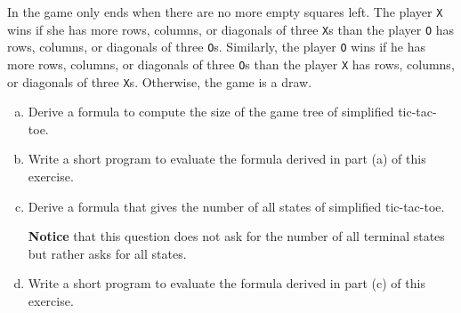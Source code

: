 \exercise
In  the game only ends when there are no more empty squares left.
The player \texttt{X} wins if she has more rows, columns, or diagonals of three \texttt{X}s than the player
\texttt{O} has rows, columns, or diagonals of three \texttt{O}s.  Similarly, the player \texttt{O} wins
if he has more rows, columns, or diagonals of three \texttt{O}s than the player \texttt{X} has rows, columns,
or diagonals of three \texttt{X}s.  Otherwise, the game is a draw. 
\begin{enumerate}[(a)]
\item Derive a formula to compute the size of the game tree of simplified tic-tac-toe.
\item Write a short program to evaluate the formula derived in part (a) of this exercise.
\item Derive a formula that gives the number of all states of simplified tic-tac-toe.  

      \textbf{Notice} that this question does not ask for the number of all terminal states but rather asks for
      all states. 
\item Write a short program to evaluate the formula derived in part (c) of this exercise.
\end{enumerate}

